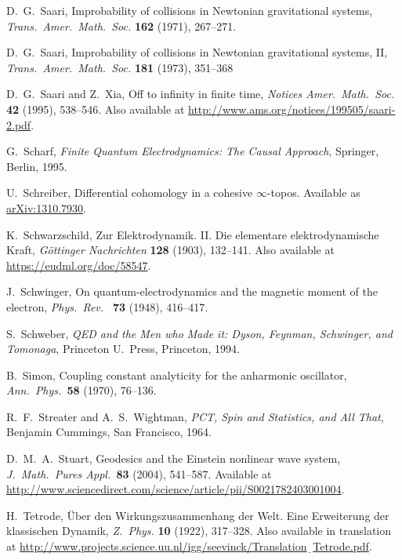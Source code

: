 \documentclass[12pt]{article}
\begin{document}
\begin{thebibliography}{10}
 D.\ G.\ Saari,  Improbability of collisions in Newtonian gravitational systems, \textsl{Trans.\ Amer.\ Math.\ Soc.} \textbf{162} (1971), 267--271.

 D.\ G.\ Saari, Improbability of collisions in Newtonian gravitational systems, II, \textsl{Trans.\ Amer.\ Math.\ Soc.} \textbf{181} (1973), 351--368 

 D.\ G.\ Saari and Z.\ Xia, Off to infinity in finite time,
\textsl{Notices Amer.\ Math.\ Soc.} \textbf{42} (1995), 538--546.  Also available at 
\href{http://www.ams.org/notices/199505/saari-2.pdf}{http://www.ams.org/\break notices/199505/saari-2.pdf}.

 G.\ Scharf, \textsl{Finite Quantum Electrodynamics: The Causal Approach}, Springer, Berlin, 1995.  

 U.\ Schreiber, Differential cohomology in a cohesive $\infty$-topos.  Available as \href{http://arxiv.org/abs/1310.7930}{arXiv:1310.7930}. 

 K.\ Schwarzschild, Zur Elektrodynamik. II. Die elementare elektrodynamische Kraft, \textsl{G\"ottinger Nachrichten} \textbf{128} (1903), 132--141.  Also available at \href{https://eudml.org/doc/58547}{https://eudml.org/doc/58547}.

 J.\ Schwinger, On quantum-electrodynamics and the magnetic moment of the electron, \textsl{Phys.\ Rev.\ } \textbf{73} (1948), 416--417.  

 S.\ Schweber, \textsl{QED and the Men who Made it: Dyson, Feynman, Schwinger, and Tomonaga}, Princeton U.\ Press, Princeton, 1994.
 
 B.\ Simon, Coupling constant analyticity for the anharmonic oscillator, \textsl{Ann.\ Phys.\ }\textbf{58} (1970), 76--136. 

 R.\ F.\ Streater and A.\ S.\ Wightman, \textsl{PCT, Spin and Statistics, and All That}, Benjamin Cummings, San Francisco, 1964.

 D.\ M.\ A.\ Stuart, Geodesics and the Einstein nonlinear wave system, 
\textsl{J.\ Math.\ Pures Appl.\ }\textbf{83} (2004), 541--587.  Available at \href{http://www.sciencedirect.com/science/article/pii/S0021782403001004}{http://www.sciencedirect.com/science/article/pii/S0021782403001004}.

 H.\ Tetrode, \"Uber den Wirkungszusammenhang der Welt. Eine Erweiterung der klassischen Dynamik, \textsl{Z.\ Phys.} \textbf{10} (1922), 317--328.  Also available in translation at  \href{http://www.projects.science.uu.nl/igg/seevinck/Translation_Tetrode.pdf}{http://\break www.projects.science.uu.nl/igg/seevinck/Translation$\underline{\;\;}$Tetrode.pdf}.


\end{thebibliography}
\end{document}
